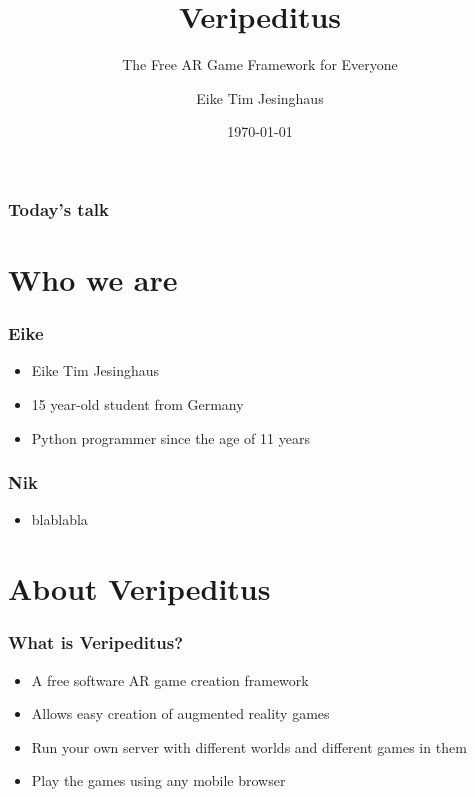 \documentclass[aspectratio=43]{beamer}
\title{Veripeditus}
\subtitle{The Free AR Game Framework for Everyone}
\author{Eike Tim Jesinghaus}
\date{\today}
\institute{FOSDEM 2017}
\begin{document}
 \begin{frame}
  \titlepage
 \end{frame}

 \begin{frame}
  \frametitle{Today's talk}
  \tableofcontents
 \end{frame}


 \section{Who we are}

 \begin{frame}
  \frametitle{Eike}

  \begin{itemize}
   \item{Eike Tim Jesinghaus}
   \item{15 year-old student from Germany}
   \item{Python programmer since the age of 11 years}
  \end{itemize}
 \end{frame}


 \begin{frame}
  \frametitle{Nik}

  \begin{itemize}
   \item{blablabla}
  \end{itemize}
 \end{frame}

 \section{About Veripeditus}

 \begin{frame}
  \frametitle{What is Veripeditus?}

  \begin{itemize}
   \item{A free software AR game creation framework}
   \item{Allows easy creation of augmented reality games}
   \item{Run your own server with different worlds and different games in them}
   \item{Play the games using any mobile browser}
  \end{itemize}
 \end{frame}
\end{document}

